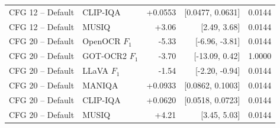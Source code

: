 \begin{longtable}{llrrr}
CFG 12 -- Default & CLIP-IQA & +0.0553 & [0.0477, 0.0631] & 0.0144 \\
CFG 12 -- Default & MUSIQ & +3.06 & [2.49, 3.68] & 0.0144 \\
CFG 20 -- Default & OpenOCR $F_1$ & -5.33 & [-6.96, -3.81] & 0.0144 \\
CFG 20 -- Default & GOT-OCR2 $F_1$ & -3.70 & [-13.09, 0.42] & 1.0000 \\
CFG 20 -- Default & LLaVA $F_1$ & -1.54 & [-2.20, -0.94] & 0.0144 \\
CFG 20 -- Default & MANIQA & +0.0933 & [0.0862, 0.1003] & 0.0144 \\
CFG 20 -- Default & CLIP-IQA & +0.0620 & [0.0518, 0.0723] & 0.0144 \\
CFG 20 -- Default & MUSIQ & +4.21 & [3.45, 5.03] & 0.0144 \\
\midrule
\end{longtable}
\endgroup

